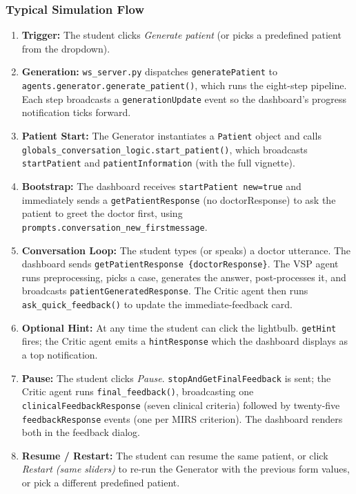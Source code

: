 \documentclass{article}
\begin{document}
\subsubsection{Typical Simulation Flow}
\begin{enumerate}
    \item \textbf{Trigger:} The student clicks \emph{Generate patient} (or picks a predefined patient from the dropdown).
    \item \textbf{Generation:} \texttt{ws\_server.py} dispatches \texttt{generatePatient} to \texttt{agents.generator.generate\_patient()}, which runs the eight-step pipeline. Each step broadcasts a \texttt{generationUpdate} event so the dashboard's progress notification ticks forward.
    \item \textbf{Patient Start:} The Generator instantiates a \texttt{Patient} object and calls \texttt{globals\_conversation\_logic.start\_patient()}, which broadcasts \texttt{startPatient} and \texttt{patientInformation} (with the full vignette).
    \item \textbf{Bootstrap:} The dashboard receives \texttt{startPatient new=true} and immediately sends a \texttt{getPatientResponse} (no doctorResponse) to ask the patient to greet the doctor first, using \texttt{prompts.conversation\_new\_firstmessage}.
    \item \textbf{Conversation Loop:} The student types (or speaks) a doctor utterance. The dashboard sends \texttt{getPatientResponse \{doctorResponse\}}. The VSP agent runs preprocessing, picks a case, generates the answer, post-processes it, and broadcasts \texttt{patientGeneratedResponse}. The Critic agent then runs \texttt{ask\_quick\_feedback()} to update the immediate-feedback card.
    \item \textbf{Optional Hint:} At any time the student can click the lightbulb. \texttt{getHint} fires; the Critic agent emits a \texttt{hintResponse} which the dashboard displays as a top notification.
    \item \textbf{Pause:} The student clicks \emph{Pause}. \texttt{stopAndGetFinalFeedback} is sent; the Critic agent runs \texttt{final\_feedback()}, broadcasting one \texttt{clinicalFeedbackResponse} (seven clinical criteria) followed by twenty-five \texttt{feedbackResponse} events (one per MIRS criterion). The dashboard renders both in the feedback dialog.
    \item \textbf{Resume / Restart:} The student can resume the same patient, or click \emph{Restart (same sliders)} to re-run the Generator with the previous form values, or pick a different predefined patient.
\end{enumerate}
\end{document}
